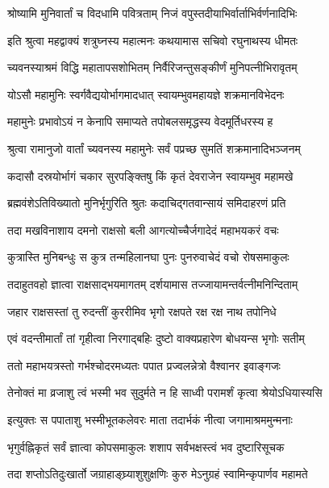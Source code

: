 \twolineshloka
{श्रोष्यामि मुनिवार्तां च विदधामि पवित्रताम्}
{निजं वपुस्तदीयाभिर्वार्ताभिर्वर्णनादिभिः}%

\twolineshloka
{इति श्रुत्वा महद्वाक्यं शत्रुघ्नस्य महात्मनः}
{कथयामास सचिवो रघुनाथस्य धीमतः}%


\twolineshloka
{च्यवनस्याश्रमं विद्धि महातापसशोभितम्}
{निर्वैरिजन्तुसङ्कीर्णं मुनिपत्नीभिरावृतम्}%

\twolineshloka
{योऽसौ महामुनिः स्वर्गवैद्ययोर्भागमादधात्}
{स्वायम्भुवमहायज्ञे शक्रमानविभेदनः}%

\twolineshloka
{महामुनेः प्रभावोऽयं न केनापि समाप्यते}
{तपोबलसमृद्धस्य वेदमूर्तिधरस्य ह}%

\twolineshloka
{श्रुत्वा रामानुजो वार्तां च्यवनस्य महामुनेः}
{सर्वं पप्रच्छ सुमतिं शक्रमानादिभञ्जनम्}%


\twolineshloka
{कदासौ दस्रयोर्भागं चकार सुरपङ्क्तिषु}
{किं कृतं देवराजेन स्वायम्भुव महामखे}%


\twolineshloka
{ब्रह्मवंशेऽतिविख्यातो मुनिर्भृगुरिति श्रुतः}
{कदाचिद्गतवान्सायं समिदाहरणं प्रति}%

\twolineshloka
{तदा मखविनाशाय दमनो राक्षसो बली}
{आगत्योच्चैर्जगादेदं महाभयकरं वचः}%

\twolineshloka
{कुत्रास्ति मुनिबन्धुः स कुत्र तन्महिलानघा}
{पुनः पुनरुवाचेदं वचो रोषसमाकुलः}%

\twolineshloka
{तदाहुतवहो ज्ञात्वा राक्षसाद्भयमागतम्}
{दर्शयामास तज्जायामन्तर्वत्नीमनिन्दिताम्}%

\twolineshloka
{जहार राक्षसस्तां तु रुदन्तीं कुररीमिव}
{भृगो रक्षपते रक्ष रक्ष नाथ तपोनिधे}%

\twolineshloka
{एवं वदन्तीमार्तां तां गृहीत्वा निरगाद्बहिः}
{दुष्टो वाक्यप्रहारेण बोधयन्स भृगोः सतीम्}%

\twolineshloka
{ततो महाभयत्रस्तो गर्भश्चोदरमध्यतः}
{पपात प्रज्वलन्नेत्रो वैश्वानर इवाङ्गजः}%

\twolineshloka
{तेनोक्तं मा व्रजाशु त्वं भस्मी भव सुदुर्मते}
{न हि साध्वी परामर्शं कृत्वा श्रेयोऽधियास्यसि}%

\twolineshloka
{इत्युक्तः स पपाताशु भस्मीभूतकलेवरः}
{माता तदार्भकं नीत्वा जगामाश्रममुन्मनाः}%

\twolineshloka
{भृगुर्वह्निकृतं सर्वं ज्ञात्वा कोपसमाकुलः}
{शशाप सर्वभक्षस्त्वं भव दुष्टारिसूचक}%

\twolineshloka
{तदा शप्तोऽतिदुःखार्तो जग्राहाङ्घ्र्याशुशुक्षणिः}
{कुरु मेऽनुग्रहं स्वामिन्कृपार्णव महामते}%

